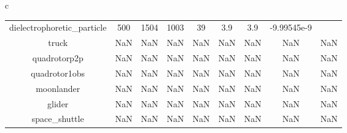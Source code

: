 \documentclass{standalone}
\begin{document}
\begin{tabular}{c}
\begin{tabular}{ccccccccc}
  dielectrophoretic\_particle & 500 & 1504 & 1003 & 39 & 3.9 & 3.9 & -9.99545e-9 & \color{red}{Infeasible Problem} \\
  truck & NaN & NaN & NaN & NaN & NaN & NaN & NaN & NaN \\
  quadrotorp2p & NaN & NaN & NaN & NaN & NaN & NaN & NaN & NaN \\
  quadrotor1obs & NaN & NaN & NaN & NaN & NaN & NaN & NaN & NaN \\
  moonlander & NaN & NaN & NaN & NaN & NaN & NaN & NaN & NaN \\
  glider & NaN & NaN & NaN & NaN & NaN & NaN & NaN & NaN \\
  space\_shuttle & NaN & NaN & NaN & NaN & NaN & NaN & NaN & NaN \\\hline
\end{tabular}
\end{tabular}
\end{document}
